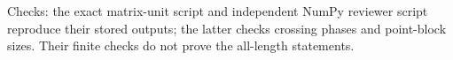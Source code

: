 Checks: the exact matrix-unit script and independent NumPy reviewer script reproduce their stored outputs;
the latter checks crossing phases and point-block sizes. Their finite checks do not prove the all-length statements.

